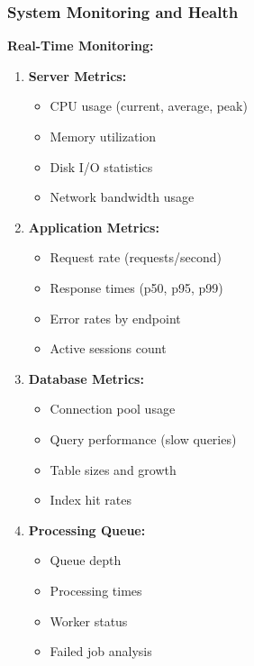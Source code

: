 \subsubsection{System Monitoring and Health}

\textbf{Real-Time Monitoring:}

\begin{enumerate}
    \item \textbf{Server Metrics:}
    \begin{itemize}
        \item CPU usage (current, average, peak)
        \item Memory utilization
        \item Disk I/O statistics
        \item Network bandwidth usage
    \end{itemize}
    
    \item \textbf{Application Metrics:}
    \begin{itemize}
        \item Request rate (requests/second)
        \item Response times (p50, p95, p99)
        \item Error rates by endpoint
        \item Active sessions count
    \end{itemize}
    
    \item \textbf{Database Metrics:}
    \begin{itemize}
        \item Connection pool usage
        \item Query performance (slow queries)
        \item Table sizes and growth
        \item Index hit rates
    \end{itemize}
    
    \item \textbf{Processing Queue:}
    \begin{itemize}
        \item Queue depth
        \item Processing times
        \item Worker status
        \item Failed job analysis
    \end{itemize}
\end{enumerate}

